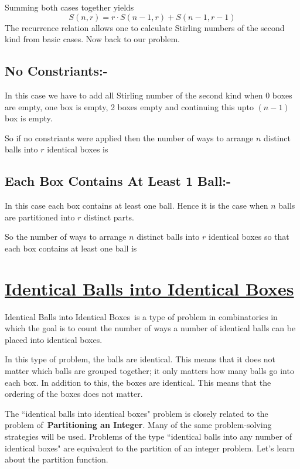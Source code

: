 \documentclass[12pt]{article}
\begin{document}
\vspace*{0.5cm}

Summing both cases together yields$$S (n,r)=r\cdot S (n-1,r)+ S (n-1,r-1)$$ The recurrence relation allows one to calculate Stirling numbers of the second kind from basic cases. Now back to our problem.

\subsection{No Constriants:-}
In this case we have to add all Stirling number of the second kind when 0 boxes are empty, one box is empty, 2 boxes empty and continuing this upto $(n-1) $ box is empty. 

So if no constriants were applied then the number of ways to arrange $n $ distinct balls into $r $ identical boxes is 

\subsection{Each Box Contains At Least 1 Ball:-}
In this case each box contains at least one ball. Hence it is the case when $n $ balls are partitioned into $r $ distinct parts. 

So the number of ways to arrange $n $ distinct  balls into $r $ identical boxes so that each box contains at least one ball is 

\section{\underline{Identical Balls into Identical Boxes}}
Identical Balls into Identical Boxes is a type of problem in combinatorics in which the goal is to count the number of ways a number of identical balls can be placed into identical boxes.

In this type of problem, the balls are identical. This means that it does not matter which balls are grouped together; it only matters how many balls go into each box. In addition to this, the boxes are identical. This means that the ordering of the boxes does not matter.

The ``identical balls into identical boxes" problem is closely related to the problem of \textbf{Partitioning an Integer}. Many of the same problem-solving strategies will be used. Problems of the type ``identical balls into any number of identical boxes" are equivalent to the partition of an integer problem. Let's learn about the partition function.
\end{document}
